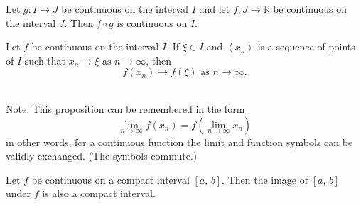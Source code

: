 \documentclass[10pt, a4paper]{article}
\newcommand{\R}{\mathbb{R}}
\newcommand{\limas}[3][n]{#2 \rightarrow #3 \text{ as } #1 \rightarrow \infty}
\newcommand{\seq}[1][x_n]{\left\langle #1 \right\rangle}
\begin{document}
\begin{proposition}
    Let $g : I \rightarrow J$ be continuous on the interval $I$ and let $f : J \rightarrow \R$ be continuous on the interval $J$. Then $f \circ g$ is continuous on $I$.
\end{proposition}

\begin{proposition}\label{prop_cont_seq_imgconv}
    Let $f$ be continuous on the interval $I$. If $\xi \in I$ and $\seq$ is a sequence of points of $I$ such that $\limas{x_n}{\xi}$, then
    $$\limas{f(x_n)}{f(\xi)}.$$
\end{proposition}
\phantom{} \\
Note: This proposition can be remembered in the form
\[
\lim_{n \rightarrow \infty}{f(x_n)} = f(\lim_{n \rightarrow \infty}{x_n})
\]
in other words, for a continuous function the limit and function symbols can be validly exchanged. (The symbols commute.)

\begin{theorem}
    Let $f$ be continuous on a compact interval $[a,\,b]$. Then the image of $[a,\,b]$ under $f$ is also a compact interval.
\end{theorem}
\end{document}
